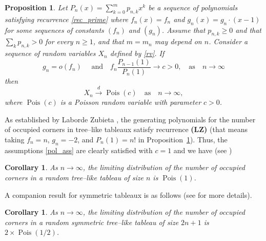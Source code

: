 \documentclass[10pt]{amsart}
\newtheorem{corollary}[theorem]{Corollary}
\newtheorem{proposition}[theorem]{Proposition}
\numberwithin{subcase}{case}
\begin{document}
\begin{proposition}\label{prop:pol_recur}
Let $P_n(x)=\sum_{k=0}^mp_{n,k}x^k$ be a sequence of polynomials  satisfying  recurrence \eqref{rec_prime}
where $f_n(x)=f_n$ and $g_n(x)=g_n\cdot(x-1)$ for some sequences of constants $(f_n)$ and $(g_n)$. Assume that $p_{n,k}\ge0$ and that  $\sum_kp_{n,k}>0$ for every $n\ge 1$, and that  $m=m_n$  may depend on $n$.  Consider a sequence of random variables $X_n$ defined by \eqref{rv}.
If 
\begin{equation}\label{pol_ass}g_n=o(f_n)\quad\mbox{ and}\quad
f_n\frac{P_{n-1}(1)}{P_{n}(1)}\to c>0,\quad \mbox{as}\quad n\to\infty
\end{equation}
then 
\[X_n\stackrel{d}{\rightarrow}\operatorname{Pois}(c)\quad \mbox{as} \quad n\to\infty,
\]
where $\operatorname{Pois}(c)$ is a Poisson random variable with parameter $c>0$.
\end{proposition}
As established by Laborde Zubieta \cite{LZ}, the generating polynomials for the number of occupied corners in tree--like tableaux satisfy recurrence {\bf(LZ)} (that means taking  $f_n=n$, $g_n=-2$, and  $P_n(1)=n!$ in Proposition~\ref{prop:pol_recur}). 
Thus, the assumptions \eqref{pol_ass}  are clearly satisfied with $c=1$ and we have (see \cite{HL})
\begin{corollary} 
As $n\to\infty$,  the limiting distribution of the number of occupied corners in a random tree--like tableau of size $n$ is $\operatorname{Pois}(1)$.
\end{corollary} 
A companion result for symmetric tableaux is as follows (see \cite{HL} for more details).
\begin{corollary}
As $n\to\infty$,  the limiting distribution of the number of occupied corners in a random symmetric tree--like tableau of size $2n+1$ is $2\times\operatorname{Pois}(1/2)$.
\end{corollary}
\end{document}
